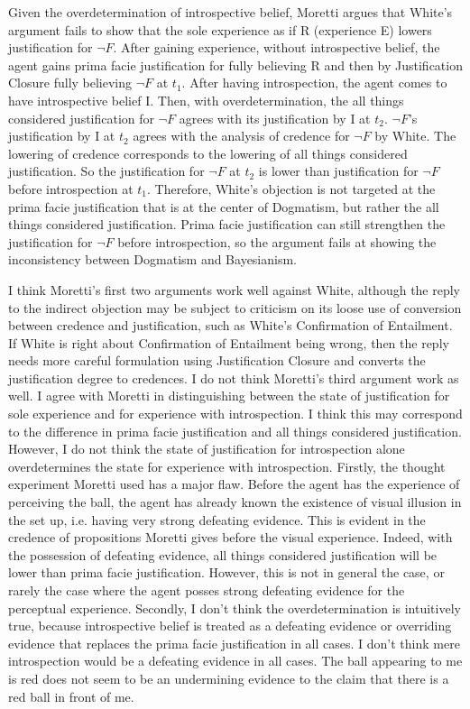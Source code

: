 Given the overdetermination of introspective belief, Moretti argues that
White's argument fails to show that the sole experience as if R
(experience E) lowers justification for $\neg F$. After
gaining experience, without introspective belief, the agent gains prima
facie justification for fully believing R and then by Justification
Closure fully believing $\neg F$ at \(t_{1}\). After having
introspection, the agent comes to have introspective belief I. Then,
with overdetermination, the all things considered justification for
$\neg F$ agrees with its justification by I at \(t_{2}\).
$\neg F$'s justification by I at \(t_{2}\) agrees with the
analysis of credence for $\neg F$ by White. The lowering of
credence corresponds to the lowering of all things considered
justification. So the justification for $\neg F$ at \(t_{2}\)
is lower than justification for $\neg F$ before introspection
at \(t_{1}\). Therefore, White's objection is not targeted at the prima
facie justification that is at the center of Dogmatism, but rather the
all things considered justification. Prima facie justification can still
strengthen the justification for $\neg F$ before
introspection, so the argument fails at showing the inconsistency
between Dogmatism and Bayesianism.

I think Moretti's first two arguments work well against White, although
the reply to the indirect objection may be subject to criticism on its
loose use of conversion between credence and justification, such as
White's Confirmation of Entailment. If White is right about Confirmation
of Entailment being wrong, then the reply needs more careful formulation
using Justification Closure and converts the justification degree to
credences. I do not think Moretti's third argument work as well. I agree
with Moretti in distinguishing between the state of justification for
sole experience and for experience with introspection. I think this may
correspond to the difference in prima facie justification and all things
considered justification. However, I do not think the state of
justification for introspection alone overdetermines the state for
experience with introspection. Firstly, the thought experiment Moretti
used has a major flaw. Before the agent has the experience of perceiving
the ball, the agent has already known the existence of visual illusion
in the set up, i.e. having very strong defeating evidence. This is
evident in the credence of propositions Moretti gives before the visual
experience. Indeed, with the possession of defeating evidence, all
things considered justification will be lower than prima facie
justification. However, this is not in general the case, or rarely the
case where the agent posses strong defeating evidence for the perceptual
experience. Secondly, I don't think the overdetermination is intuitively
true, because introspective belief is treated as a defeating evidence or
overriding evidence that replaces the prima facie justification in all
cases. I don't think mere introspection would be a defeating evidence in
all cases. The ball appearing to me is red does not seem to be an
undermining evidence to the claim that there is a red ball in front of
me.

